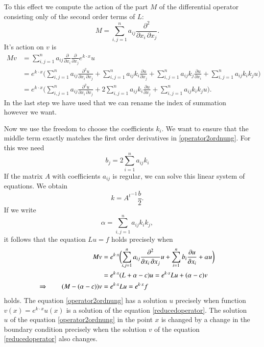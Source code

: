 To this effect we compute the action of the part $M$ of the differential
operator consisting only of the second order terms of $L$:
\[
M=\sum_{i,j=1}^n a_{ij}\frac{\partial^2}{\partial x_i\,\partial x_j}.
\]
It's action on $v$ is
\begin{align*}
Mv
&=
\sum_{i,j=1}^na_{ij}
\frac{\partial}{\partial x_i}
\frac{\partial}{\partial x_j} e^{k\cdot x}u
\\
&=
e^{k\cdot x}
\biggl(
\sum_{i,j=1}^na_{ij}
\frac{\partial^2 u}{\partial x_i\,\partial x_j}
+
\sum_{i,j=1}^n a_{ij}k_i\frac{\partial u}{\partial x_j}
+
\sum_{i,j=1}^n a_{ij}k_j\frac{\partial u}{\partial x_i}
+
\sum_{i,j=1}^n a_{ij}k_ik_ju
\biggr)
\\
&=
e^{k\cdot x}
\biggl(
\sum_{i,j=1}^na_{ij}
\frac{\partial^2 u}{\partial x_i\,\partial x_j}
+
2\sum_{i,j=1}^n a_{ij}k_i\frac{\partial u}{\partial x_j}
+
\sum_{i,j=1}^n a_{ij}k_ik_ju
\biggr).
\end{align*}
In the last step we have used that we can rename the index of summation
however we want.

Now we use the freedom to choose the coefficients $k_i$.
We want to ensure that the middle term exactly matches the
first order derivatives in \eqref{operator2ordnung}.
For this wee need
\begin{equation}
b_j=2\sum_{i=1}^n a_{ij}k_i
\label{bequation}
\end{equation}
If the matrix $A$ with coefficients $a_{ij}$ is regular, we can
solve this linear system of equations.
We obtain
\[
k=
{A^t}^{-1}
\frac{b}2.
\]
If we write
\[
\alpha = \sum_{i,j=1}^n a_{ij}k_ik_j,
\]
it follows that the equation
$Lu=f$ holds precisely when
\begin{align}
Mv
&=
e^{k\cdot x}\biggl(
\sum_{i,j=1}^n a_{ij}\frac{\partial^2}{\partial x_i\,\partial x_j}u
+\sum_{i=1}^n b_i\frac{\partial u}{\partial x_i}+\alpha u
\biggr)
\\
&=
e^{k\cdot x}
(L+\alpha -c)u
=
e^{k\cdot x}Lu + (\alpha -c)v
\notag
\\
\Rightarrow\qquad
(M-(\alpha - c))v&=e^{k\cdot x}Lu=e^{k\cdot x}f
\label{reducedoperator}
\end{align}
holds.
The equation \eqref{operator2ordnung} has a solution $u$ precisely
when function $v(x)=e^{k\cdot x}u(x)$  is a solution of the equation
\eqref{reducedoperator}.
The solution $u$ of the equation \eqref{operator2ordnung} in the point $x$
is changed by a change in the boundary condition precisely when the solution
$v$ of the equation \eqref{reducedoperator} also changes.

